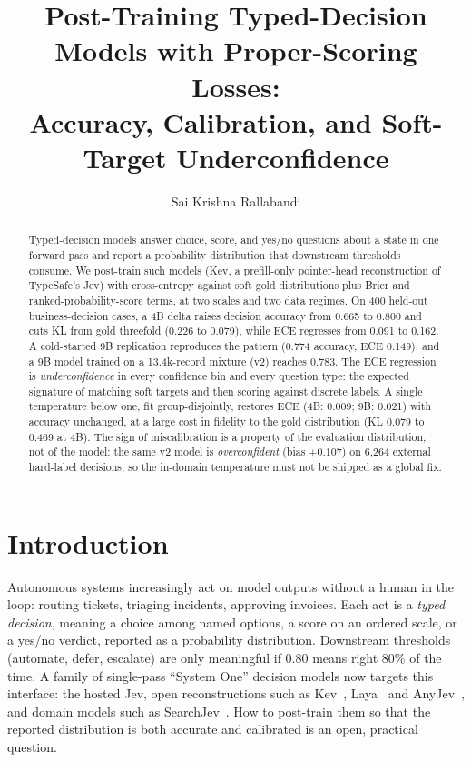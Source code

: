 \documentclass{article}
\title{Post-Training Typed-Decision Models with Proper-Scoring Losses:\\Accuracy, Calibration, and Soft-Target Underconfidence}
\author{Sai Krishna Rallabandi}
\begin{document}
\maketitle

\begin{abstract}
Typed-decision models answer choice, score, and yes/no questions about a
state in one forward pass and report a probability distribution that
downstream thresholds consume. We post-train such models (Kev, a
prefill-only pointer-head reconstruction of TypeSafe's Jev) with
cross-entropy against soft gold distributions plus Brier and
ranked-probability-score terms, at two scales and two data regimes. On 400
held-out business-decision cases, a 4B delta raises decision accuracy from
0.665 to 0.800 and cuts KL from gold threefold (0.226 to 0.079), while ECE
regresses from 0.091 to 0.162. A cold-started 9B replication reproduces the
pattern (0.774 accuracy, ECE 0.149), and a 9B model trained on a 13.4k-record
mixture (v2) reaches 0.783. The ECE regression is \emph{underconfidence} in
every confidence bin and every question type: the expected signature of
matching soft targets and then scoring against discrete labels. A single
temperature below one, fit group-disjointly, restores ECE (4B: 0.009;
9B: 0.021) with accuracy unchanged, at a large cost in fidelity to the gold
distribution (KL 0.079 to 0.469 at 4B). The sign of miscalibration is a
property of the evaluation distribution, not of the model: the same v2
model is \emph{overconfident} (bias $+0.107$) on 6,264 external hard-label
decisions, so the in-domain temperature must not be shipped as a global
fix.
\end{abstract}

\section{Introduction}

Autonomous systems increasingly act on model outputs without a human in the
loop: routing tickets, triaging incidents, approving invoices. Each act is a
\emph{typed decision}, meaning a choice among named options, a score on an
ordered scale, or a yes/no verdict, reported as a probability distribution.
Downstream thresholds (automate, defer, escalate) are only meaningful if
0.80 means right 80\% of the time. A family of single-pass ``System One''
decision models now targets this interface: the hosted Jev, open
reconstructions such as Kev~\cite{kev2026}, Laya~\cite{laya2026} and
AnyJev~\cite{zhang2026anyjev}, and domain models such as
SearchJev~\cite{cao2026searchjev}. How to post-train them so that the
reported distribution is both accurate and calibrated is an open,
practical question.
\end{document}
